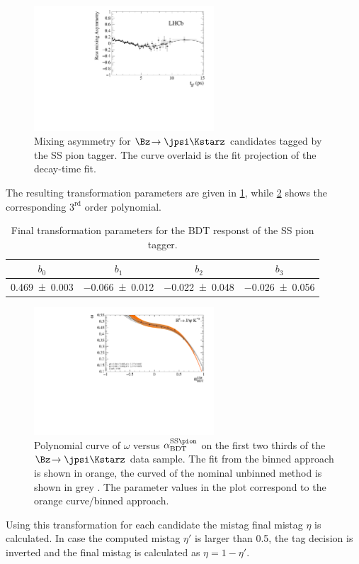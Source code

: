 \begin{figure}[tbp]
	\begin{center}
		\includegraphics[width=0.6\textwidth]{08FlavourTagging/figs/Asymmetry_SSPion.pdf}
	\end{center}
	\caption{Mixing asymmetry for $\Bz\!\to\jpsi\Kstarz$ candidates tagged by the SS pion tagger.
	The curve overlaid is the fit projection of the decay-time fit.}
	\label{fig:MixingSSPion}
\end{figure}
The resulting transformation parameters are given in \cref{tab:transformationSSPion}, while \cref{fig:transformationSSPion} shows the corresponding $3^{\text{rd}}$ order polynomial.
\begin{table}[tbp]
	\centering
	\caption{Final transformation parameters for the BDT responst of the SS pion tagger.}
	\begin{tabular}{cccc}
		\toprule
		$b_0$ & $b_1$ & $b_2$ & $b_3$ \\
		\midrule
		\num{0.469\pm0.003} & \num{-0.066\pm0.012} & \num{-0.022\pm0.048} & \num{-0.026\pm0.056} \\
		\bottomrule
	\end{tabular}
	\label{tab:transformationSSPion}
\end{table}
\begin{figure}[tbp]
	\begin{center}
		\includegraphics[width=0.6\textwidth]{08FlavourTagging/figs/SSPionBDTTrafo.pdf}
	\end{center}
	\caption{Polynomial curve of $\omega$ versus $\alpha^{\text{SS}\pion}_\text{BDT}$ on the first two thirds of the $\Bz\!\to\jpsi\Kstarz$ data sample.
	The fit from the binned approach is shown in orange, the curved of the nominal unbinned method is shown in grey .
	The parameter values in the plot correspond to the orange curve/binned approach.}
	\label{fig:transformationSSPion}
\end{figure}
Using this transformation for each \Bz candidate the mistag final mistag $\eta$ is calculated.
In case the computed mistag $\eta'$ is larger than \num{0.5}, the tag decision is inverted and the final mistag is calculated as $\eta=1-\eta'$.

